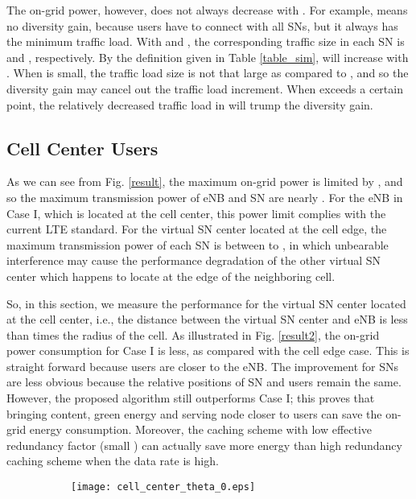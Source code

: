 \documentclass[journal,12pt,onecolumn]{IEEEtran}
\begin{document}
\begin{titlepage}
\begin{center}
The on-grid power, however, does not always decrease with . For example,  means no diversity gain, because users have to connect with all SNs, but it always has the minimum traffic load. With  and , the corresponding traffic size in each SN is  and , respectively. By the definition given in Table \ref{table_sim},  will increase with . When  is small, the traffic load size  is not that large as compared to , and so the diversity gain may cancel out the traffic load increment. When  exceeds a certain point, the relatively decreased traffic load in  will trump the diversity gain.


\subsection{Cell Center Users}
As we can see from Fig. \ref{result}, the maximum on-grid power is limited by  , and so the maximum transmission power of eNB and SN are nearly  . For the eNB in Case I, which is located at the cell center, this power limit complies with the current LTE standard. For the virtual SN center located at the cell edge, the maximum transmission power of each SN is between   to  , in which unbearable interference may cause the performance degradation of the other virtual SN center which happens to locate at the edge of the neighboring cell. 

So, in this section, we measure the performance for the virtual SN center located at the cell center, i.e., the distance between the virtual SN center and eNB is less than  times the radius of the cell. As illustrated in Fig. \ref{result2}, the on-grid power consumption for Case I is less, as compared with the cell edge case. This is straight forward because users are closer to the eNB. The improvement for SNs are less obvious because the relative positions of SN and users remain the same. However, the proposed algorithm still outperforms Case I; this proves that bringing content, green energy and serving node closer to users can save the on-grid energy consumption. Moreover, the caching scheme with low effective redundancy factor (small ) can actually save more energy than high redundancy caching scheme when the data rate is high.




\begin{figure}
\vspace{-1em}
\centering   
                \begin{subfigure}[!t]{3 in}
                \texttt{[image: cell\_center\_theta\_0.eps]}\caption{}
\end{subfigure}
        ~
        

\end{figure}
\end{center}
\end{titlepage}
\end{document}
